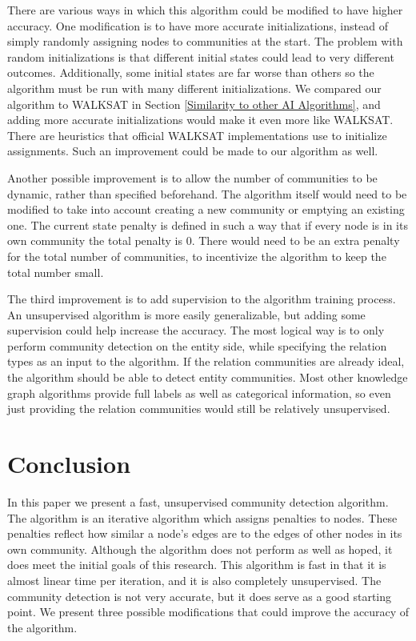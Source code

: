 \documentclass[12pt]{article}
\begin{document}
There are various ways in which this algorithm could be modified to have higher
accuracy. One modification is to have more accurate initializations, instead of
simply randomly assigning nodes to communities at the start. The problem with
random initializations is that different initial states could lead to very
different outcomes. Additionally, some initial states are far worse than others
so the algorithm must be run with many different initializations. We compared
our algorithm to WALKSAT in Section \ref{Similarity to other AI Algorithms}, and
adding more accurate initializations would make it even more like WALKSAT. There
are heuristics that official WALKSAT implementations use to initialize
assignments. Such an improvement could be made to our algorithm as well.

Another possible improvement is to allow the number of communities to be dynamic,
rather than specified beforehand. The algorithm itself would need to be modified
to take into account creating a new community or emptying an existing one. The
current state penalty is defined in such a way that if every node is in its own
community the total penalty is 0. There would need to be an extra penalty for
the total number of communities, to incentivize the algorithm to keep the
total number small.

The third improvement is to add supervision to the algorithm training process.
An unsupervised algorithm is more easily generalizable, but adding some supervision
could help increase the accuracy. The most logical way is to only perform community
detection on the entity side, while specifying the relation types as an input
to the algorithm. If the relation communities are already ideal, the algorithm
should be able to detect entity communities. Most other knowledge graph algorithms
\cite{Nickel2011}\cite{Gao2015}\cite{Chang2014} provide full labels as well as
categorical information, so even just providing the relation communities would
still be relatively unsupervised.

\section{Conclusion}
\label{sec:Conclusion}

In this paper we present a fast, unsupervised community detection algorithm. The
algorithm is an iterative algorithm which assigns penalties to nodes. These
penalties reflect how similar a node's edges are to the edges of other nodes  in
its own community. Although the algorithm does not perform as well as hoped, it
does meet the initial goals of this research. This algorithm is fast in that it
is almost linear time per iteration, and it is also completely unsupervised. The
community detection is not very accurate, but it does serve as a good starting
point. We present three possible modifications that could improve the accuracy
of the algorithm.
\end{document}
